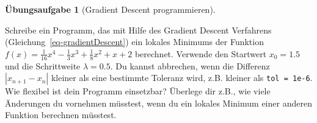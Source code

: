 \documentclass[
  letterpaper,
  DIV=11,
  oneside]{scrreprt}
\theoremstyle{definition}
\newtheorem{exercise}{Übungsaufgabe}[chapter]
\theoremstyle{definition}
\theoremstyle{remark}
\begin{document}
\leavevmode{}%
\begin{exercise}[Gradient Descent
programmieren]\label{exr-GradientDescentFirstTry}

Schreibe ein Programm, das mit Hilfe des Gradient Descent Verfahrens
(Gleichung~\ref{eq-gradientDescent}) ein lokales Minimums der Funktion
\(f(x) = \frac{1}{16}x^4 - \frac{1}{3}x^3 + \frac{1}{8}x^2 + x + 2\)
berechnet. Verwende den Startwert \(x_0 = 1.5\) und die Schrittweite
\(\lambda = 0.5\). Du kannst abbrechen, wenn die Differenz
\(|x_{n+1} - x_n|\) kleiner als eine bestimmte Toleranz wird, z.B.
kleiner als \texttt{tol\ =\ 1e-6}. Wie flexibel ist dein Programm
einsetzbar? Überlege dir z.B., wie viele Änderungen du vornehmen
müsstest, wenn du ein lokales Minimum einer anderen Funktion berechnen
müsstest.

\end{exercise}
\end{document}
